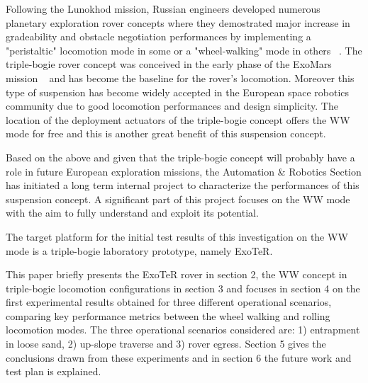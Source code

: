 \documentclass[a4paper,twocolumn]{esapub2005} %
\begin{document}
Following the Lunokhod mission, Russian engineers developed numerous planetary exploration rover concepts where they demostrated major increase in gradeability and obstacle negotiation performances by implementing a "peristaltic" locomotion mode in some or a "wheel-walking" mode in others ~\cite{Ehrenfreund1998}. The triple-bogie rover concept was conceived in the early phase of the ExoMars mission ~\cite{Patel2010} and has become the baseline for the rover's locomotion. Moreover this type of suspension has become widely accepted in the European space robotics community due to good locomotion performances and design simplicity. The location of the deployment actuators of the triple-bogie concept offers the WW mode for free and this is another great benefit of this suspension concept.

Based on the above and given that the triple-bogie concept will probably have a role in future European exploration missions, the Automation \& Robotics Section has initiated a long term internal project to characterize the performances of this suspension concept. A significant part of this project focuses on the WW mode with the aim to fully understand and exploit its potential.

The target platform for the initial test results of this investigation on the WW mode is a triple-bogie laboratory prototype, namely ExoTeR. 

%

This paper briefly presents the ExoTeR rover in section 2, the WW
concept in triple-bogie locomotion configurations in section 3 and focuses in
section 4 on the first experimental results obtained for three different
operational scenarios, comparing key performance metrics between the wheel
walking and rolling locomotion modes. The three operational scenarios
considered are: 1) entrapment in loose sand, 2) up-slope traverse and 3) rover
egress. Section 5 gives the conclusions drawn from these experiments and in
section 6 the future work and test plan is explained.
\end{document}
